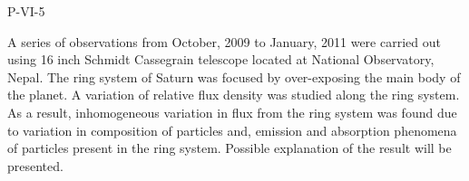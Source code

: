 P-VI-5


\bigskip



\bigskip

\noindent A series of observations from October, 2009 to January, 2011 were carried out using 16 inch Schmidt Cassegrain telescope located at National Observatory, Nepal. The ring system of Saturn was focused by over-exposing the main body of the planet. A variation of relative flux density was studied along the ring system. As a result, inhomogeneous variation in flux from the ring system was found due to variation in composition of particles and, emission and absorption phenomena of particles present in the ring system. Possible explanation of the result will be presented.

